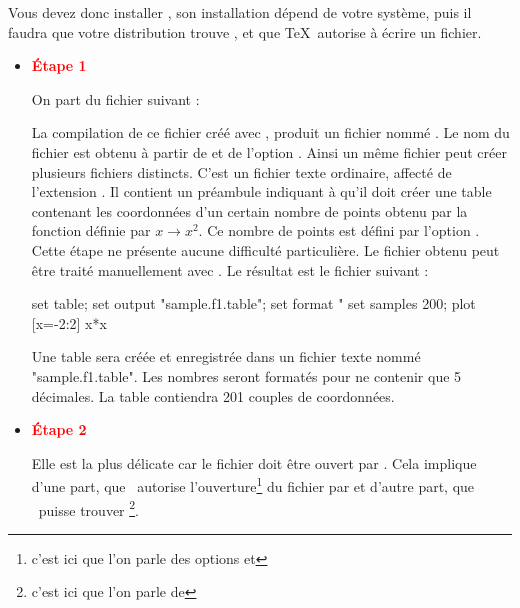  Vous devez donc installer ,  son installation dépend de votre système, puis  il faudra que votre distribution trouve , et que  \TeX\  autorise  à écrire un fichier.

\begin{itemize}
\item \textcolor{red}{\textbf{Étape 1}}

On part du fichier  suivant :

\medskip
{}
 \tkzActivOn

La compilation de ce fichier créé avec \TIKZ, produit un fichier nommé    . Le nom du fichier est obtenu à partir de  et de l'option . Ainsi un même fichier peut créer plusieurs fichiers distincts. C'est un fichier texte ordinaire, affecté de l'extension . Il contient un préambule indiquant à  qu'il doit créer une table contenant les coordonnées d'un certain nombre de points obtenu par la fonction définie par $x\longrightarrow x^2$. Ce nombre de points est défini par l'option . Cette étape ne présente aucune difficulté particulière. Le fichier obtenu peut être traité manuellement avec .  Le résultat est le fichier suivant :

\begin{tkzltxexample}[]
set table; set output "sample.f1.table"; set format "%
set samples 200; plot [x=-2:2] x*x
\end{tkzltxexample}

Une table sera créée et enregistrée dans un fichier texte nommé "sample.f1.table". Les nombres seront formatés pour ne contenir que 5 décimales.
La table contiendra 201 couples de coordonnées.

\item  \textcolor{red}{\textbf{Étape 2}}

Elle est la plus délicate car  le fichier  doit être ouvert par . Cela implique d'une part, que   \TEX\  autorise l'ouverture\footnote{c'est ici que l'on parle des options  et }
   du  fichier  par  et d'autre part, que   \TEX\ puisse trouver \footnote{c'est ici que l'on parle de }.


\end{itemize}
